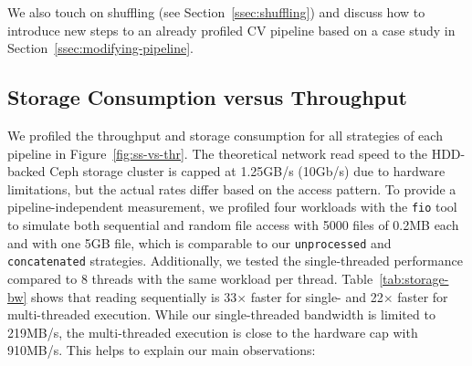 We also touch on shuffling (see Section~\ref{ssec:shuffling}) {\color{diff}and discuss how to introduce new steps to an already profiled CV pipeline based on a case study in Section~\ref{ssec:modifying-pipeline}.}
\vspace{-0.25cm}
\begin{table}[h]
\caption{{\color{diff}\texttt{fio} profile of our storage cluster}}
\label{tab:storage-bw}
\end{table}
\vspace{-0.9cm}

\subsection{Storage Consumption versus Throughput}
\label{ssec:storage-versus-throughput}

We profiled the throughput and storage consumption for all strategies of each pipeline in Figure~\ref{fig:ss-vs-thr}.
{\color{diff}The theoretical network read speed to the HDD-backed Ceph storage cluster is capped at 1.25\:GB/s (10\:Gb/s) due to hardware limitations, but the actual rates differ based on the access pattern.
To provide a pipeline-independent measurement, we profiled four workloads with the \texttt{fio} tool~\cite{fio} to simulate both sequential and random file access with 5000 files of 0.2\:MB each and with one 5\:GB file, which is comparable to our \texttt{unprocessed} and \texttt{concatenated} strategies.
Additionally, we tested the single-threaded performance compared to 8 threads with the same workload per thread.
Table~\ref{tab:storage-bw} shows that reading sequentially is 33$\times$ faster for single- and 22$\times$ faster for multi-threaded execution.
While our single-threaded bandwidth is limited to 219\:MB/s, the multi-threaded execution is close to the hardware cap with 910\:MB/s.
This helps to explain our main observations:}

